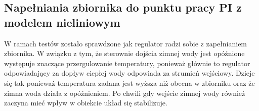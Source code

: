 \subsection{Napełniania zbiornika do punktu pracy PI z modelem nieliniowym}
\indent W ramach testów zostało sprawdzone jak regulator radzi sobie z zapełnianiem zbiornika. W związku z tym, że sterownie dojścia zimnej wody jest opóźnione występuje znaczące przergulowanie temperatury, ponieważ głównie to regulator odpowiadający za dopływ ciepłej wody odpowiada za strumień wejściowy. Dzieje się tak ponieważ temperatura zadana jest wyższa niż obecna w zbiorniku oraz że zimna woda działa z opóźnieniem. Po chwili gdy wejście zimnej wody również zaczyna mieć wpływ w obiekcie układ się stabilizuje.
\FloatBarrier
    
\FloatBarrier 
